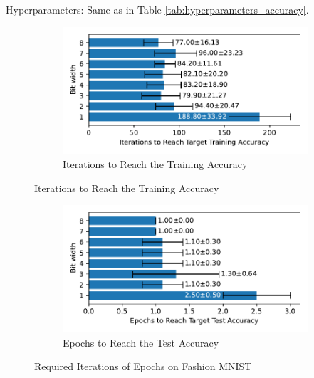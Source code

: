     Hyperparameters: Same as in Table \ref{tab:hyperparameters_accuracy}.

    \label{appendix:iterations_fashion_mnist}
        \begin{figure}[H]
            \centering
            \begin{subfigure}[H]{\textwidth}
                \centering
                \includegraphics[width=\textwidth]{../standard/FashionMNIST/plots/fashionmnist_train_iters_horizontal.pdf}
                \caption{Iterations to Reach the Training Accuracy}
            \end{subfigure}
        \end{figure}
        \begin{figure}[H]
            \centering
            \ContinuedFloat
            \begin{subfigure}[H]{\textwidth}
                \centering
                \includegraphics[width=\textwidth]{../standard/FashionMNIST/plots/fashionmnist_test_iters_horizontal.pdf}
                \caption{Epochs to Reach the Test Accuracy}
            \end{subfigure}
            \caption{Required Iterations of Epochs on Fashion MNIST}
        \end{figure}

